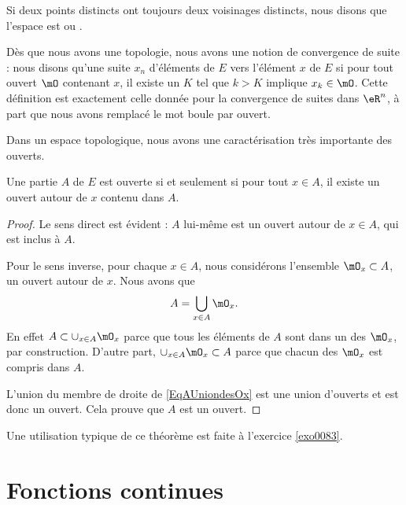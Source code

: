 \begin{definition}
    Si deux points distincts ont toujours deux voisinages distincts, nous disons que l'espace est  ou .
\end{definition}

Dès que nous avons une topologie, nous avons une notion de convergence de suite : nous disons qu'une suite $x_n$ d'éléments de $E$  vers l'élément $x$ de $E$ si pour tout ouvert $\mO$ contenant $x$, il existe un $K$ tel que $k>K$ implique $x_k\in\mO$. Cette définition est exactement celle donnée pour la convergence de suites dans $\eR^n$, à part que nous avons remplacé le mot \og boule\fg{} par \og ouvert\fg.

Dans un espace topologique, nous avons une caractérisation très importante des ouverts.
\begin{theorem}		\label{ThoPartieOUvpartouv}
Une partie $A$ de $E$ est ouverte si et seulement si pour tout $x\in A$, il existe un ouvert autour de $x$ contenu dans $A$.
\end{theorem}

\begin{proof}
Le sens direct est évident : $A$ lui-même est un ouvert autour de $x\in A$, qui est inclus à $A$.

Pour le sens inverse, pour chaque $x\in A$, nous considérons l'ensemble $\mO_x\subset A$, un ouvert autour de $x$. Nous avons que
\begin{equation}	\label{EqAUniondesOx}
	A=\bigcup_{x\in A}\mO_x.
\end{equation}
En effet $A\subset\cup_{x\in A}\mO_x$ parce que tous les éléments de $A$ sont dans un des $\mO_x$, par construction. D'autre part, $\cup_{x\in A}\mO_x\subset A$ parce que chacun des $\mO_x$ est compris dans $A$.

L'union du membre de droite de \eqref{EqAUniondesOx} est une union d'ouverts et est donc un ouvert. Cela prouve que $A$ est un ouvert.

\end{proof}

Une utilisation typique de ce théorème est faite à l'exercice \ref{exo0083}.

\section{Fonctions continues}

